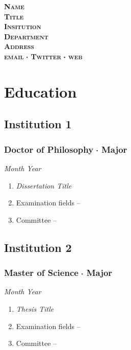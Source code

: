 \documentclass[11pt,letterpaper]{article}
\newcommand*\sq{\mathbin{\vcenter{\hbox{\rule{.3ex}{.3ex}}}}} %
\begin{document}


{\centering
        \textsc{ %
            \textbf{
                Name\\
                {\footnotesize Title} \\
                {\footnotesize Insitution} \\
                {\footnotesize Department} \\
                {\footnotesize Address}\\
                {\footnotesize email $\sq$ Twitter $\sq$ web }
            }
        }
   \par}

\noindent\makebox[\linewidth]{\rule{\textwidth}{0.5pt}} %


\section*{Education}
\subsection*{Institution 1}
\subsubsection*{Doctor of Philosophy $\sq$ Major}\hfill{\textit{Month Year}}
\begin{enumerate}[leftmargin=*,topsep=0pt,itemsep=-1ex,partopsep=1ex,parsep=1ex,label=(\arabic*)]
    \item[]\textit{Dissertation Title}
    \item[]Examination fields -- 
    \item[]Committee -- 
\end{enumerate}

\subsection*{Institution 2}
\subsubsection*{Master of Science $\sq$ Major}\hfill{\textit{Month Year}}
\begin{enumerate}[leftmargin=*,topsep=0pt,itemsep=-1ex,partopsep=1ex,parsep=1ex,label=(\arabic*)]
    \item[]\textit{Thesis Title}
    \item[]Examination fields -- 
    \item[]Committee -- 
\end{enumerate}
\end{document}

